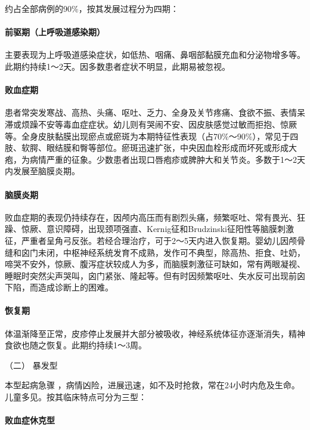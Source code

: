 约占全部病例的90\%，按其发展过程分为四期：

\paragraph{前驱期（上呼吸道感染期）}

主要表现为上呼吸道感染症状，如低热、咽痛、鼻咽部黏膜充血和分泌物增多等。此期约持续1～2天。因多数患者症状不明显，此期易被忽视。

\paragraph{败血症期}

患者常突发寒战、高热、头痛、呕吐、乏力、全身及关节疼痛、食欲不振、表情呆滞或烦躁不安等毒血症症状。幼儿则有哭闹不安、因皮肤感觉过敏而拒抱、惊厥等。全身皮肤黏膜出现瘀点或瘀斑为本期特征性表现（占70\%～90\%），常见于四肢、软腭、眼结膜和臀等部位。瘀斑迅速扩张，中央因血栓形成而坏死或形成大疱，为病情严重的征象。少数患者出现口唇疱疹或脾肿大和关节炎。多数于1～2天内发展至脑膜炎期。

\paragraph{脑膜炎期}

败血症期的表现仍持续存在，因颅内高压而有剧烈头痛，频繁呕吐、常有畏光、狂躁、惊厥、意识障碍，出现颈项强直、Kernig征和Brudzinski征阳性等脑膜刺激征，严重者呈角弓反张。若经合理治疗，可于2～5天内进入恢复期。婴幼儿因颅骨缝和囟门未闭，中枢神经系统发育不成熟，发作可不典型，除高热、拒食、吐奶，啼哭不安外，惊厥、腹泻症状较成人为多，而脑膜刺激征可缺如，常有两眼凝视、睡眠时突然尖声哭叫，囟门紧张、隆起等。但有时因频繁呕吐、失水反可出现前囟下陷，而造成诊断上的困难。

\paragraph{恢复期}

体温渐降至正常，皮疹停止发展并大部分被吸收，神经系统体征亦逐渐消失，精神食欲也随之恢复。此期约持续1～3周。

\hypertarget{text00231.htmlux5cux23CHP7-11-2-2-2}{}
（二） 暴发型

本型起病急骤
，病情凶险，进展迅速，如不及时抢救，常在24小时内危及生命。儿童多见。按其临床特点可分为三型：

\paragraph{败血症休克型}

